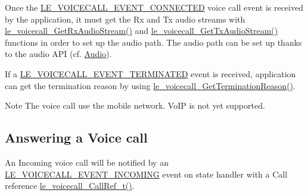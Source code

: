 Once the \hyperlink{le__voicecall__interface_8h_a51066eb84677e4d4c5447aaf8dd18ff1ad3cd30048fd3957b80293e876712e79b}{L\+E\+\_\+\+V\+O\+I\+C\+E\+C\+A\+L\+L\+\_\+\+E\+V\+E\+N\+T\+\_\+\+C\+O\+N\+N\+E\+C\+T\+E\+D} voice call event is received by the application, it must get the Rx and Tx audio streams with \hyperlink{le__voicecall__interface_8h_afd7256c9caa5a1cb8ccca588c7913797}{le\+\_\+voicecall\+\_\+\+Get\+Rx\+Audio\+Stream()} and \hyperlink{le__voicecall__interface_8h_ab2dc17c9f027ed291576a1b6f6b6fed1}{le\+\_\+voicecall\+\_\+\+Get\+Tx\+Audio\+Stream()} functions in order to set up the audio path. The audio path can be set up thanks to the audio A\+P\+I (cf. \hyperlink{c_audio}{Audio}).

If a \hyperlink{le__voicecall__interface_8h_a51066eb84677e4d4c5447aaf8dd18ff1a55cdfb321f8b09d5037edeb1ec6b04e6}{L\+E\+\_\+\+V\+O\+I\+C\+E\+C\+A\+L\+L\+\_\+\+E\+V\+E\+N\+T\+\_\+\+T\+E\+R\+M\+I\+N\+A\+T\+E\+D} event is received, application can get the termination reason by using \hyperlink{le__voicecall__interface_8h_a1e04e5a857e17e67eb75cd1c6136f163}{le\+\_\+voicecall\+\_\+\+Get\+Termination\+Reason()}.

\begin{DoxyNote}{Note}
The voice call use the mobile network. Vo\+I\+P is not yet supported.
\end{DoxyNote}
\hypertarget{c_le_voicecall_c_le_voicecall_incoming}{}\subsection{Answering a Voice call}\label{c_le_voicecall_c_le_voicecall_incoming}
An Incoming voice call will be notified by an \hyperlink{le__voicecall__interface_8h_a51066eb84677e4d4c5447aaf8dd18ff1abeff6317fd3fa13e2ad42e20da589dc6}{L\+E\+\_\+\+V\+O\+I\+C\+E\+C\+A\+L\+L\+\_\+\+E\+V\+E\+N\+T\+\_\+\+I\+N\+C\+O\+M\+I\+N\+G} event on state handler with a Call reference \hyperlink{le__voicecall__interface_8h_a74c8b6a9f13f7a8ef47b6b1d57d8ab56}{le\+\_\+voicecall\+\_\+\+Call\+Ref\+\_\+t()}.

